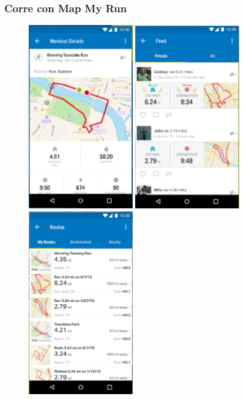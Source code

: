 \documentclass[a4paper, 11pt]{article}
\begin{document}
\begin{itemize}
                    \subsubsection{Corre con Map My Run}

                      \begin{figure}[h]
                          \centering
                          \includegraphics[width=0.4\textwidth]{mapmy1}
                          \includegraphics[width=0.4\textwidth]{mapmy2}
                          \includegraphics[width=0.4\textwidth]{mapmy3}

\end{figure}
\end{itemize}
\end{document}
